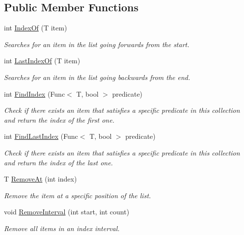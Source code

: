 \subsection*{Public Member Functions}
\begin{DoxyCompactItemize}
\item 
int \hyperlink{interface_c5_1_1_i_indexed_abad58598415e0383ddbc9275db69d92a}{Index\+Of} (T item)
\begin{DoxyCompactList}\small\item\em Searches for an item in the list going forwards from the start. \end{DoxyCompactList}\item 
int \hyperlink{interface_c5_1_1_i_indexed_a50f274e0f7b4cd2e54db4cb61a003b95}{Last\+Index\+Of} (T item)
\begin{DoxyCompactList}\small\item\em Searches for an item in the list going backwards from the end. \end{DoxyCompactList}\item 
int \hyperlink{interface_c5_1_1_i_indexed_ac5431f5a857165b38d36b066d17e288c}{Find\+Index} (Func$<$ T, bool $>$ predicate)
\begin{DoxyCompactList}\small\item\em Check if there exists an item that satisfies a specific predicate in this collection and return the index of the first one. \end{DoxyCompactList}\item 
int \hyperlink{interface_c5_1_1_i_indexed_a4283e602a819d8ea03d1af10983b5105}{Find\+Last\+Index} (Func$<$ T, bool $>$ predicate)
\begin{DoxyCompactList}\small\item\em Check if there exists an item that satisfies a specific predicate in this collection and return the index of the last one. \end{DoxyCompactList}\item 
T \hyperlink{interface_c5_1_1_i_indexed_ac741e6d3d7c6a30bb8a013bb29591ca4}{Remove\+At} (int index)
\begin{DoxyCompactList}\small\item\em Remove the item at a specific position of the list. \end{DoxyCompactList}\item 
void \hyperlink{interface_c5_1_1_i_indexed_aa9d2a1706ba0361079d31c02bad3e810}{Remove\+Interval} (int start, int count)
\begin{DoxyCompactList}\small\item\em Remove all items in an index interval. \end{DoxyCompactList}\end{DoxyCompactItemize}
